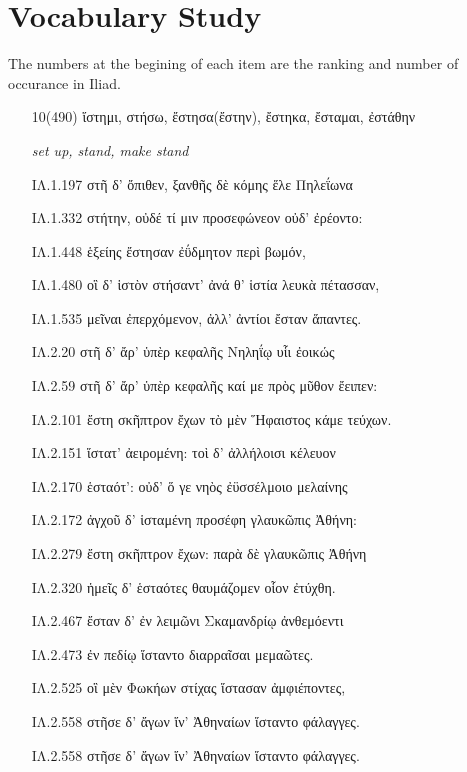 \chapter*{Vocabulary Study}
%

The numbers at the begining of each item are the ranking and 
number of occurance in Iliad.

\begin{enumerate}

\clearpage
\item[\large 10(490)]{\large \g ἵστημι, στήσω, ἔστησα(ἔστην), ἔστηκα, ἔσταμαι, ἐστάθην}

\hspace{0.2cm} \textit{set up, stand, make stand}

{\g
ΙΛ.1.197 στῆ δ' ὄπιθεν, ξανθῆς δὲ κόμης ἕλε Πηλεΐωνα 

ΙΛ.1.332 στήτην, οὐδέ τί μιν προσεφώνεον οὐδ' ἐρέοντο: 

ΙΛ.1.448 ἑξείης ἔστησαν ἐΰδμητον περὶ βωμόν, 

ΙΛ.1.480 οἳ δ' ἱστὸν στήσαντ' ἀνά θ' ἱστία λευκὰ πέτασσαν, 

ΙΛ.1.535 μεῖναι ἐπερχόμενον, ἀλλ' ἀντίοι ἔσταν ἅπαντες. 

ΙΛ.2.20 στῆ δ' ἄρ' ὑπὲρ κεφαλῆς Νηληΐῳ υἷι ἐοικώς  

ΙΛ.2.59 στῆ δ' ἄρ' ὑπὲρ κεφαλῆς καί με πρὸς μῦθον ἔειπεν: 

ΙΛ.2.101 ἔστη σκῆπτρον ἔχων τὸ μὲν Ἥφαιστος κάμε τεύχων. 

ΙΛ.2.151 ἵστατ' ἀειρομένη: τοὶ δ' ἀλλήλοισι κέλευον  

ΙΛ.2.170 ἑσταότ': οὐδ' ὅ γε νηὸς ἐϋσσέλμοιο μελαίνης  

ΙΛ.2.172 ἀγχοῦ δ' ἱσταμένη προσέφη γλαυκῶπις Ἀθήνη:  

ΙΛ.2.279 ἔστη σκῆπτρον ἔχων: παρὰ δὲ γλαυκῶπις Ἀθήνη  

ΙΛ.2.320 ἡμεῖς δ' ἑσταότες θαυμάζομεν οἷον ἐτύχθη.  

ΙΛ.2.467 ἔσταν δ' ἐν λειμῶνι Σκαμανδρίῳ ἀνθεμόεντι  

ΙΛ.2.473 ἐν πεδίῳ ἵσταντο διαρραῖσαι μεμαῶτες.  

ΙΛ.2.525 οἳ μὲν Φωκήων στίχας ἵστασαν ἀμφιέποντες,  

ΙΛ.2.558 στῆσε δ' ἄγων ἵν' Ἀθηναίων ἵσταντο φάλαγγες.  

ΙΛ.2.558 στῆσε δ' ἄγων ἵν' Ἀθηναίων ἵσταντο φάλαγγες.  

}
\end{enumerate}
